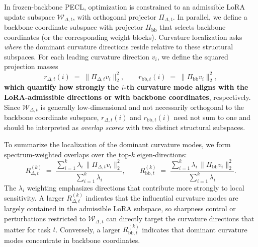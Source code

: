 \documentclass{article}
\theoremstyle{plain}
\theoremstyle{definition}
\theoremstyle{remark}
\begin{document}
In frozen-backbone PECL, optimization is constrained to an admissible LoRA update subspace $\mathcal W_{\Delta,t}$, with orthogonal projector $\Pi_{\Delta,t}$. In parallel, we define a backbone coordinate subspace with projector $\Pi_{\mathrm{bb}}$ that selects backbone coordinates (or the corresponding weight blocks). Curvature localization asks \emph{where} the dominant curvature directions reside relative to these structural subspaces. For each leading curvature direction $v_i$, we define the squared projection masses
$$
r_{\Delta,t}(i)\;=\;\|\Pi_{\Delta,t}v_i\|_2^2,
\qquad
r_{\mathrm{bb},t}(i)\;=\;\|\Pi_{\mathrm{bb}}v_i\|_2^2,
$$
\textbf{which quantify how strongly the $i$-th curvature mode aligns with the LoRA-admissible directions or with backbone coordinates}, respectively. Since $\mathcal W_{\Delta,t}$ is generally low-dimensional and not necessarily orthogonal to the backbone coordinate subspace, $r_{\Delta,t}(i)$ and $r_{\mathrm{bb},t}(i)$ need not sum to one and should be interpreted as \emph{overlap scores} with two distinct structural subspaces.

To summarize the localization of the dominant curvature modes, we form spectrum-weighted overlaps over the top-$k$ eigen-directions:
$$
R_{\Delta,t}^{(k)}
\;=\;
\frac{\sum_{i=1}^{k}\lambda_i\,\|\Pi_{\Delta,t}v_i\|_2^2}{\sum_{i=1}^{k}\lambda_i},
\qquad
R_{\mathrm{bb},t}^{(k)}
\;=\;
\frac{\sum_{i=1}^{k}\lambda_i\,\|\Pi_{\mathrm{bb}}v_i\|_2^2}{\sum_{i=1}^{k}\lambda_i}.
$$
The $\lambda_i$ weighting emphasizes directions that contribute more strongly to local sensitivity. A larger $R_{\Delta,t}^{(k)}$ indicates that the influential curvature modes are largely contained in the admissible LoRA subspace, so sharpness control or perturbations restricted to $\mathcal W_{\Delta,t}$ can directly target the curvature directions that matter for task $t$. Conversely, a larger $R_{\mathrm{bb},t}^{(k)}$ indicates that dominant curvature modes concentrate in backbone coordinates.
\end{document}

